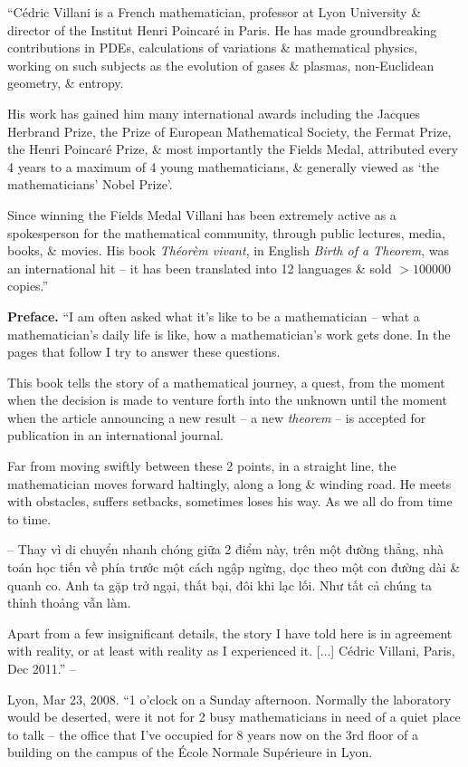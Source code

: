\documentclass{article}
\begin{document}
\begin{enumerate}
	``{\sc C\'edric Villani} is a French mathematician, professor at Lyon University \& director of the Institut Henri Poincaré in Paris. He has made groundbreaking contributions in PDEs, calculations of variations \& mathematical physics, working on such subjects as the evolution of gases \& plasmas, non-Euclidean geometry, \& entropy.
	
	His work has gained him many international awards including the Jacques Herbrand Prize, the Prize of European Mathematical Society, the Fermat Prize, the Henri Poincar\'e Prize, \& most importantly the Fields Medal, attributed every 4 years to a maximum of 4 young mathematicians, \& generally viewed as `the mathematicians' Nobel Prize'.
	
	Since winning the Fields Medal {\sc Villani} has been extremely active as a spokesperson for the mathematical community, through public lectures, media, books, \& movies. His book {\it Th\'eor\`em vivant}, in English {\it Birth of a Theorem}, was an international hit -- it has been translated into 12 languages \& sold $> 100000$ copies.''
	
	{\bf Preface.} ``I am often asked what it's like to be a mathematician -- what a mathematician's daily life is like, how a mathematician's work gets done. In the pages that follow I try to answer these questions.
	
	This book tells the story of a mathematical journey, a quest, from the moment when the decision is made to venture forth into the unknown until the moment when the article announcing a new result -- a new {\it theorem} -- is accepted for publication in an international journal.
	
	Far from moving swiftly between these 2 points, in a straight line, the mathematician moves forward haltingly, along a long \& winding road. He meets with obstacles, suffers setbacks, sometimes loses his way. As we all do from time to time.
	
	-- Thay vì di chuyển nhanh chóng giữa 2 điểm này, trên một đường thẳng, nhà toán học tiến về phía trước một cách ngập ngừng, dọc theo một con đường dài \& quanh co. Anh ta gặp trở ngại, thất bại, đôi khi lạc lối. Như tất cả chúng ta thỉnh thoảng vẫn làm.
	
	Apart from a few insignificant details, the story I have told here is in agreement with reality, or at least with reality as I experienced it. [$\ldots$] {\sc C\'edric Villani}, Paris, Dec 2011.'' -- \cite[p. 5]{Villani2015}
	
	 Lyon, Mar 23, 2008. ``1 o'clock on a Sunday afternoon. Normally the laboratory would be deserted, were it not for 2 busy mathematicians in need of a quiet place to talk -- the office that I've occupied for  8 years now on the 3rd floor of a building on the campus of the \'Ecole Normale Sup\'erieure in Lyon.
	

\end{enumerate}
\end{document}
